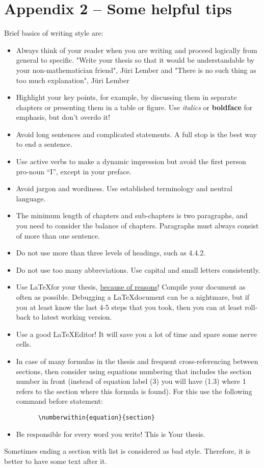 \section*{Appendix 2 -- Some helpful tips}

Brief basics of writing style are:
\begin{itemize}
\item Always think of your reader when you are writing and proceed
  logically from general to specific. "Write your thesis so that it would be understandable by your non-mathematician friend", Jüri Lember and "There is no such thing as too much explanation", Jüri Lember
  \item Highlight your key points, for example, by discussing them in
  separate chapters or presenting them in a table or figure. Use
  \textit{italics} or \textbf{boldface} for emphasis, but don't overdo
  it!
\item Avoid long sentences and complicated statements. A full stop is
  the best way to end a sentence.
\item Use active verbs to make a dynamic impression but avoid the
  first person pro-noun ``I'', except in your preface.
\item Avoid jargon and wordiness. Use established terminology and
  neutral language.
\item The minimum length of chapters and sub-chapters is two
  paragraphs, and you need to consider the balance of
  chapters. Paragraphs must always consist of more than one sentence.
\item Do not use more than three levels of headings, such as 4.4.2.
\item Do not use too many abbreviations. Use capital and small letters
  consistently.
  \item Use \LaTeX for your thesis, \href{https://amrys.wordpress.com/2013/01/16/why-your-should-latex-your-dissertation-or-why-you-dont-have-to-write-your-dissertation-in-word/}{because of reasons}! Compile your document as often as possible. Debugging a \LaTeX document can be a nightmare, but if you at least know the last 4-5 steps that you took, then you can at least roll-back to latest working version.
  \item Use a good \LaTeX Editor! It will save you a lot of time and spare some nerve cells.
  \item In case of many formulas in the thesis and frequent cross-referencing between sections, then consider using equations numbering that includes the section number in front (instead of equation label (3) you will have (1.3) where 1 refers to the section where this formula is found). For this use the following command before \verb__ statement:
  \begin{verbatim}
      \numberwithin{equation}{section}
  \end{verbatim}
  

  \item Be responsible for every word you write! This is Your thesis.
\end{itemize}

Sometimes ending a section with list is considered as bad
style. Therefore, it is better to have some text after it.
